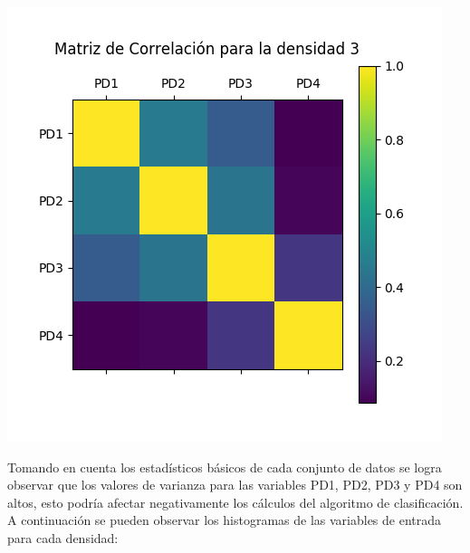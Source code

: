 \includegraphics[scale=0.5]{correlacionD3.jpg}

Tomando en cuenta los estadísticos básicos de cada conjunto de datos se logra observar que los valores de varianza para las variables PD1, PD2, PD3 y PD4 son altos, esto podría afectar negativamente los cálculos del algoritmo de clasificación. A continuación se pueden observar los
histogramas de las variables de entrada para cada densidad:


